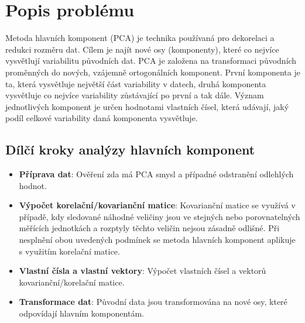 \section{Popis problému}

Metoda hlavních komponent (PCA) je technika používaná pro dekorelaci a redukci rozměru dat. Cílem je najít nové osy (komponenty), které co nejvíce vysvětlují variabilitu původních dat. PCA je založena na transformaci původních proměnných do nových, vzájemně ortogonálních komponent. První komponenta je ta, která vysvětluje největší část variability v datech, druhá komponenta vysvětluje co nejvíce variability zůstávající po první a tak dále. Význam jednotlivých komponent je určen hodnotami vlastních čísel, která udávají, jaký podíl celkové variability daná komponenta vysvětluje.\cite{potuckova2024}\cite{koutroumbas2008}

\subsection{Dílčí kroky analýzy hlavních komponent}

\begin{itemize}
    \item \textbf{Příprava dat}: Ověření zda má PCA smysl a případné odstranění odlehlých hodnot.
    \item \textbf{Výpočet korelační/kovarianční matice}: Kovarianční matice se využívá v případě, kdy sledované náhodné veličiny jsou ve stejných nebo porovnatelných měřících jednotkách a rozptyly těchto veličin nejsou zásadně odlišné. Při nesplnění obou uvedených podmínek se metoda hlavních komponent aplikuje s využitím korelační matice.\cite{potuckova2024}
    \item \textbf{Vlastní čísla a vlastní vektory}: Výpočet vlastních čísel a vektorů kovarianční/korelační matice.
    \item \textbf{Transformace dat}: Původní data jsou transformována na nové osy, které odpovídají hlavním komponentám.
\end{itemize}

